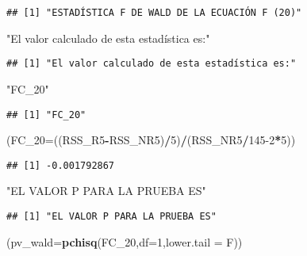 \documentclass[
]{article}
\newenvironment{Shaded}{\begin{snugshade}}{\end{snugshade}}
\newcommand{\DataTypeTok}[1]{\textcolor[rgb]{0.13,0.29,0.53}{#1}}
\newcommand{\DecValTok}[1]{\textcolor[rgb]{0.00,0.00,0.81}{#1}}
\newcommand{\KeywordTok}[1]{\textcolor[rgb]{0.13,0.29,0.53}{\textbf{#1}}}
\newcommand{\NormalTok}[1]{#1}
\newcommand{\OperatorTok}[1]{\textcolor[rgb]{0.81,0.36,0.00}{\textbf{#1}}}
\newcommand{\StringTok}[1]{\textcolor[rgb]{0.31,0.60,0.02}{#1}}
\begin{document}
\begin{verbatim}
## [1] "ESTADÍSTICA F DE WALD DE LA ECUACIÓN F (20)"
\end{verbatim}

\begin{Shaded}
\begin{Highlighting}[]
\StringTok{"El valor calculado de esta estadística es:"}
\end{Highlighting}
\end{Shaded}

\begin{verbatim}
## [1] "El valor calculado de esta estadística es:"
\end{verbatim}

\begin{Shaded}
\begin{Highlighting}[]
\StringTok{"FC_20"}
\end{Highlighting}
\end{Shaded}

\begin{verbatim}
## [1] "FC_20"
\end{verbatim}

\begin{Shaded}
\begin{Highlighting}[]
\NormalTok{(}\DataTypeTok{FC_20=}\NormalTok{((RSS_R5}\OperatorTok{-}\NormalTok{RSS_NR5)}\OperatorTok{/}\DecValTok{5}\NormalTok{)}\OperatorTok{/}\NormalTok{(RSS_NR5}\OperatorTok{/}\DecValTok{145-2}\OperatorTok{*}\DecValTok{5}\NormalTok{))}
\end{Highlighting}
\end{Shaded}

\begin{verbatim}
## [1] -0.001792867
\end{verbatim}

\begin{Shaded}
\begin{Highlighting}[]
\StringTok{"EL VALOR P PARA LA PRUEBA ES"}
\end{Highlighting}
\end{Shaded}

\begin{verbatim}
## [1] "EL VALOR P PARA LA PRUEBA ES"
\end{verbatim}

\begin{Shaded}
\begin{Highlighting}[]
\NormalTok{(}\DataTypeTok{pv_wald=}\KeywordTok{pchisq}\NormalTok{(FC_}\DecValTok{20}\NormalTok{,}\DataTypeTok{df=}\DecValTok{1}\NormalTok{,}\DataTypeTok{lower.tail =}\NormalTok{ F))}
\end{Highlighting}
\end{Shaded}
\end{document}
